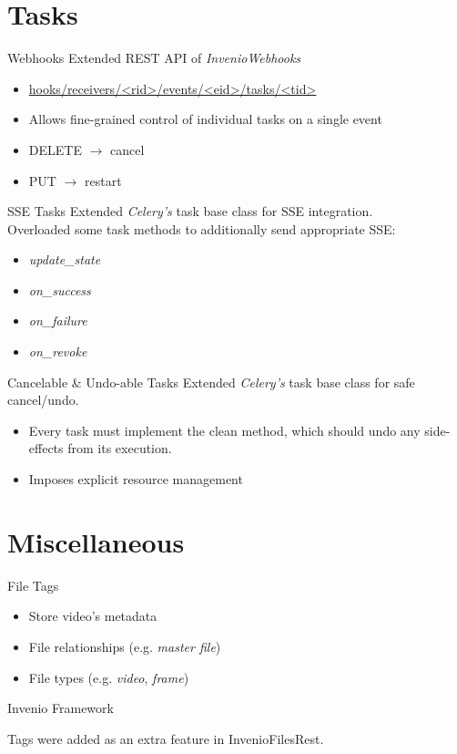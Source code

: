 \documentclass{beamer}
\newcommand{\contrib}[1]{
  \vfill
  \begin{alertblock}{Invenio Framework}
    #1
  \end{alertblock}
}
\begin{document}
	\section{Tasks}
	\begin{frame}{Webhooks}
    	  Extended REST API of \emph{InvenioWebhooks}
    	  \begin{itemize}
    	    \item{\url{hooks/receivers/<rid>/events/<eid>/tasks/<tid>}}
    	    \item{Allows fine-grained control of individual tasks on a single event}
    	    \item{\alert{DELETE} $\rightarrow$ cancel}
    	    \item{\alert{PUT} $\rightarrow$ restart}
      \end{itemize}
	\end{frame}
	\begin{frame}{SSE Tasks}
      	Extended \emph{Celery's} task base class for SSE integration. \\
      	\vfill
      	Overloaded some task methods to additionally send appropriate SSE:
  	    \begin{itemize}
    	    \item{\emph{update_state}}
    	    \item{\emph{on_success}}
    	    \item{\emph{on_failure}}
    	    \item{\emph{on_revoke}}
  	    \end{itemize}
	\end{frame}
	
	\begin{frame}{Cancelable \& Undo-able Tasks}
	  Extended \emph{Celery's} task base class for safe cancel/undo. \\
	  \begin{itemize}
	    \item{Every task must implement the \alert{clean} method}, which should undo any side-effects from its execution.
	    \item{Imposes explicit resource management}
	  \end{itemize}
	\end{frame}

  \section{Miscellaneous}
  	\begin{frame}{File Tags}
    	\begin{itemize}
    	  \item{Store video's metadata}
    	  \item{File relationships (e.g. \emph{master file})}
    	  \item{File types (e.g. \emph{video}, \emph{frame})}
	  \end{itemize}

	  \contrib{
		  Tags were added as an extra feature in \alert{InvenioFilesRest}.
    	}
	\end{frame}
\end{document}
